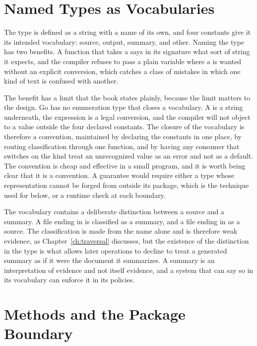 \section{Named Types as Vocabularies}

The type  is defined as a string with a name of its own, and four constants give it its intended vocabulary: source, output, summary, and other. Naming the type has two benefits. A function that takes a  says in its signature what sort of string it expects, and the compiler refuses to pass a plain  variable where a  is wanted without an explicit conversion, which catches a class of mistakes in which one kind of text is confused with another.

The benefit has a limit that the book states plainly, because the limit matters to the design. Go has no enumeration type that closes a vocabulary. A  is a string underneath, the expression  is a legal conversion, and the compiler will not object to a value outside the four declared constants. The closure of the vocabulary is therefore a convention, maintained by declaring the constants in one place, by routing classification through one function, and by having any consumer that switches on the kind treat an unrecognized value as an error and not as a default. The convention is cheap and effective in a small program, and it is worth being clear that it is a convention. A guarantee would require either a type whose representation cannot be forged from outside its package, which is the technique used for  below, or a runtime check at each boundary.

The vocabulary contains a deliberate distinction between a source and a summary. A file ending in  is classified as a summary, and a file ending in  as a source. The classification is made from the name alone and is therefore weak evidence, as Chapter~\ref{ch:traversal} discusses, but the existence of the distinction in the type is what allows later operations to decline to treat a generated summary as if it were the document it summarizes. A summary is an interpretation of evidence and not itself evidence, and a system that can say so in its vocabulary can enforce it in its policies.

\section{Methods and the Package Boundary}

